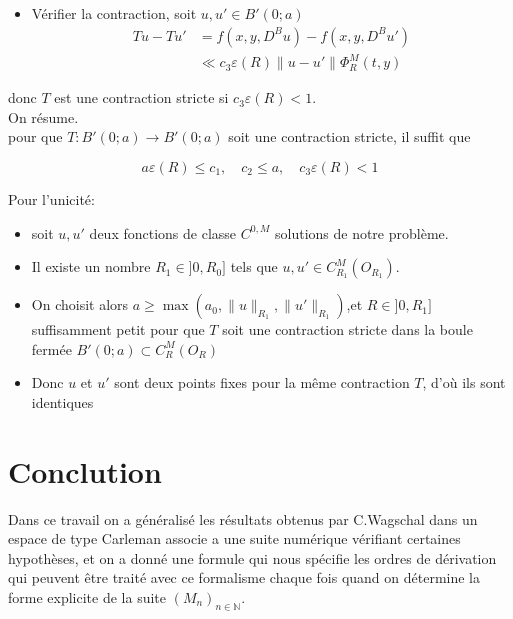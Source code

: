 \documentclass{beamer}
\newcommand{\N}{\ensuremath{\mathbb{N}}}
\begin{document}
\begin{frame}
\begin{itemize}
\item Vérifier la contraction, soit $u, u' \in  B'(0; a)$
\begin{align*}
Tu-Tu'&= f(x,y,D^Bu)- f(x,y,D^Bu')\\
& \ll c_3\varepsilon(R) \|u-u'\| \Phi^M_R(t,y)
\end{align*}
\end{itemize}

donc $T$ est une contraction stricte si $c_3\varepsilon(R)<1$.\\
On résume.\\
pour que $T:B'(0;a)\rightarrow B'(0;a)$ soit une contraction stricte, il suffit que 

$$ a\varepsilon(R)\leq c_1, \quad c_2\leq a, \quad c_3\varepsilon(R)<1$$




\end{frame}



\begin{frame}
Pour l'unicité: \\
\begin{itemize}


\item soit $u,u'$ deux fonctions de classe $C^{0,M}$ solutions de notre problème.

\item Il existe un nombre $R_1 \in ]0,R_0]$ tels que $u,u' \in C^M_{R_1}(O_{R_1})$.

\item On choisit alors $a \geq \max(a_0,\|u\|_{R_1},\|u'\|_{R_1})$,et $R\in ]0,R_1]$ suffisamment petit pour que $T$ soit une contraction stricte dans la boule fermée $B'(0;a) \subset C^M_R(O_R)$
\item Donc $u$ et $u'$ sont deux points fixes pour la même contraction $T$, d'où ils sont identiques

\end{itemize}





\end{frame}
\section{Conclution}
\begin{frame}
Dans ce travail on a généralisé les résultats obtenus par C.Wagschal dans un espace de type Carleman associe a une suite numérique vérifiant certaines hypothèses, et on a donné une formule qui nous spécifie les ordres de dérivation qui peuvent être traité avec ce formalisme chaque fois quand on détermine la forme explicite de la suite $(M_n)_{n \in \N}$.
\end{frame}
\end{document}
